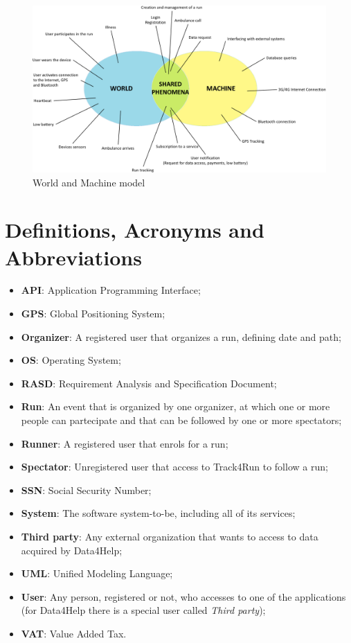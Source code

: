\begin{figure}[H]
\begin{center}
  \includegraphics[width=\textwidth]{img/WorldMachine.png}
  \hspace{0.05\linewidth}
  \centering
  \caption{World and Machine model}
  \label{img:WandMmodel}
\end{center}
\end{figure}

\section{Definitions, Acronyms and Abbreviations}
\begin{itemize}
  \setlength{\itemindent}{-.4in}
  \item[] \textbf{API}: Application Programming Interface;
  \item[] \textbf{GPS}: Global Positioning System;
  \item[] \textbf{Organizer}: A registered user that organizes a run, defining date and path;
  \item[] \textbf{OS}: Operating System;
  \item[] \textbf{RASD}: Requirement Analysis and Specification Document;
  \item[] \textbf{Run}: An event that is organized by one organizer, at which one or more people can partecipate and that can be followed by one or more spectators;
  \item[] \textbf{Runner}: A registered user that enrols for a run;
  \item[] \textbf{Spectator}: Unregistered user that access to Track4Run to follow a run;
  \item[] \textbf{SSN}: Social Security Number;
  \item[] \textbf{System}: The software system-to-be, including all of its services;
  \item[] \textbf{Third party}: Any external organization that wants to access to data acquired by Data4Help;
  \item[] \textbf{UML}: Unified Modeling Language;
  \item[] \textbf{User}: Any person, registered or not, who accesses to one of the applications (for Data4Help there is a special user called \textit{Third party});
  \item[] \textbf{VAT}: Value Added Tax.
\end{itemize}

